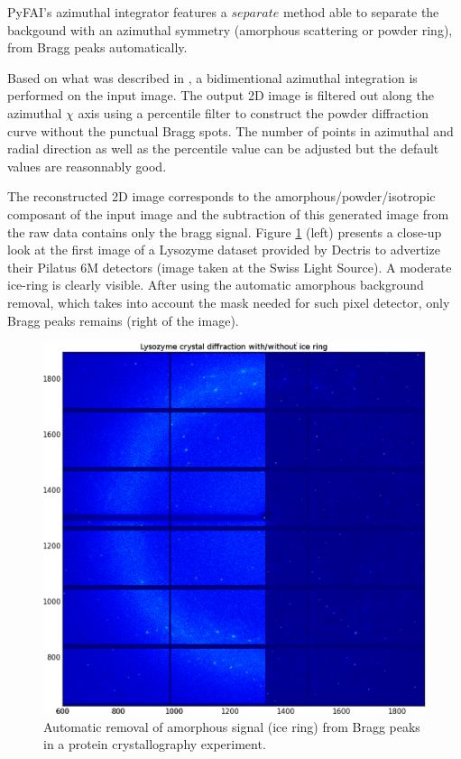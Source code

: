 \documentclass[preprint]{iucr}
\begin{document}
PyFAI's azimuthal integrator features a $separate$ method able to separate
the backgound with an azimuthal symmetry (amorphous scattering or powder ring),
from Bragg peaks automatically.

Based on what was described in \cite{PyFAI_PDJ}, a bidimentional azimuthal
integration is performed on the input image.
The output 2D image is filtered out along the azimuthal $\chi$ axis using a
percentile filter to construct the powder diffraction curve without the punctual
Bragg spots.
The number of points in azimuthal and radial direction as well as
the percentile value can be adjusted but the default values are reasonnably
good.

The reconstructed 2D image corresponds to the amorphous/powder/isotropic
composant of the input image and the subtraction of this generated image from
the raw data contains only the bragg signal.
Figure \ref{separate} (left)
presents a close-up look at the first image of a Lysozyme dataset provided by Dectris to
advertize their Pilatus 6M detectors (image taken at the Swiss Light Source). A
moderate ice-ring is clearly visible. After using the automatic amorphous
background removal, which takes into account the mask needed for such pixel
detector, only Bragg peaks remains (right of the image).

\begin{figure}
\label{separate}
\begin{center}
\includegraphics[width=15cm]{merged.eps}
\caption{Automatic removal of amorphous signal (ice ring) from Bragg peaks in a
protein crystallography experiment.}
\end{center}
\end{figure}
\end{document}
